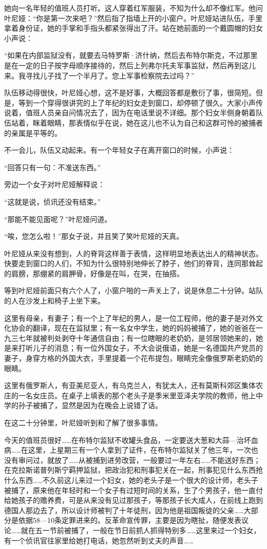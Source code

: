 她向一名年轻的值班人员打听。这人穿着红军服装，不知为什么却不像红军。他问叶尼娅：“你是第一次来吧？”然后指了指墙上开的小窗户。叶尼娅站进队伍，手里拿着身份证，她的手掌和手指头都紧张得出了汗。站在她前面的一个戴圆帽的妇女小声说：

“如果在内部监狱没有，就要去马特罗斯·济什纳，然后去布特尔斯克，不过那里是在一定的日子按字母顺序接待的，然后上列弗尔托夫军事监狱，然后再到这儿来。我寻找儿子找了一个半月了。您上军事检察院去过吗？”

队伍移动得很快，叶尼娅心想，这不是好事，大概回答都是敷衍了事，很简短。但是，等到一个穿得很讲究的上了年纪的妇女走到窗口，却停顿了很久。大家小声传说着，值班人员亲自问情况去了，因为在电话里说不详细。那个妇女半侧身朝着队伍站着，眯着眼睛，那表情似乎在说，她在这儿也不认为自己和这群可怜的被捕者的亲属是平等的。

不一会儿，队伍又动起来。有一个年轻女子在离开窗口的时候，小声说：

“回答只有一句：不准送东西。”

旁边一个女子对叶尼娅解释说：

“这就是说，侦讯还没有结束。”

“那能不能见面呢？”叶尼娅问道。

“唉，您怎么啦！”那女子说，并且笑了笑叶尼娅的天真。

叶尼娅从来没有想到，人的脊背这样善于表情，这样明显地表达出人的精神状态。快要走到窗口的人们，不知为什么很特别地伸长了脖子，他们的脊背，连同那耸起的肩膀，那绷紧的肩胛骨，好像是在叫，在哭，在抽搭。

等到叶尼娅前面只有六个人了，小窗户啪的一声关上了，说是休息二十分钟。站队的人在沙发上和椅子上坐下来。

这里有母亲，有妻子；有一个上了年纪的男人，是一位工程师，他的妻子是对外文化协会的翻译，现在在监狱里；有一名女中学生，她的妈妈被捕了，她的爸爸在一九三七年就被判处剥夺十年通信自由；有一位瞎眼的老奶奶，是邻居领她来的，她是来打听儿子的消息；有一位外国女子，不大会说俄语，她是一名德国共产党员的妻子，身穿方格的外国大衣，手里提着一个花布提包，眼睛完全像俄罗斯老奶奶的眼睛。

这里有俄罗斯人，有亚美尼亚人，有乌克兰人，有犹太人，还有莫斯科郊区集体农庄的一名女庄员。在桌子上填表的那个老头子是季米里亚泽夫学院的教师，他上中学的孙子被捕了，显然是因为在晚会上说错了话。

在这二十分钟里，叶尼娅听到和了解了很多事情。

今天的值班员很好……在布特尔监狱不收罐头食品，一定要送大葱和大蒜—治坏血病……在这里，上星期三有一个人拿到了证件，在布特尔监狱关了他三年，一次也没有审问过，就放了……从被捕到进劳改营，一般要过一年左右……不能送好东西；在克拉斯诺普列斯宁羁押监狱，把政治犯和刑事犯关在一起，刑事犯见什么东西抢什么东西……不久前这儿来过一个妇女，她的老头子是一个很大的设计师，老头子被捕了，原来他在年轻时和一个女子有过短时间的关系，生了个男孩子，他一直付给她孩子的赡养费，可是从来没有见过那孩子，等那孩子长大成人，在前线上跑到德国人那边去了，所以设计师被判了十年徒刑，因为他是祖国叛徒的父亲……大部分是依据58—10条定罪进来的。反革命宣传罪，主要是因为瞎扯，随便发表议论……就在五一节前被捕了，一般在节日前抓人抓得特别多……这里来过一个妇女，有一个侦讯官往家里给她打电话，她忽然听到丈夫的声音……

